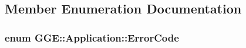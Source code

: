 \subsection{Member Enumeration Documentation}
\hypertarget{class_g_g_e_1_1_application_a39cb0a658b749fd014b3355c157d267b}{
\subsubsection[{Error\+Code}]{\setlength{\rightskip}{0pt plus 5cm}enum {\bf G\+G\+E\+::\+Application\+::\+Error\+Code}\hspace{0.3cm}{\ttfamily [private]}}}\label{class_g_g_e_1_1_application_a39cb0a658b749fd014b3355c157d267b}
